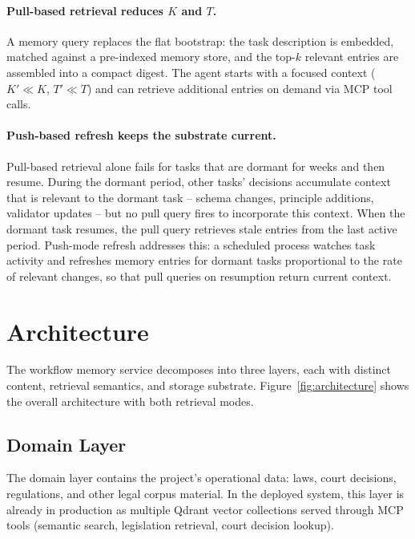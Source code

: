 \documentclass[11pt]{article}
\begin{document}
\paragraph{Pull-based retrieval reduces $K$ and $T$.}
A memory query replaces the flat bootstrap: the task description is embedded, matched against a pre-indexed memory store, and the top-$k$ relevant entries are assembled into a compact digest.
The agent starts with a focused context ($K' \ll K$, $T' \ll T$) and can retrieve additional entries on demand via MCP tool calls.

\paragraph{Push-based refresh keeps the substrate current.}
Pull-based retrieval alone fails for tasks that are dormant for weeks and then resume.
During the dormant period, other tasks' decisions accumulate context that is relevant to the dormant task -- schema changes, principle additions, validator updates -- but no pull query fires to incorporate this context.
When the dormant task resumes, the pull query retrieves stale entries from the last active period.
Push-mode refresh addresses this: a scheduled process watches task activity and refreshes memory entries for dormant tasks proportional to the rate of relevant changes, so that pull queries on resumption return current context.


\section{Architecture}
\label{sec:architecture}

The workflow memory service decomposes into three layers, each with distinct content, retrieval semantics, and storage substrate.
Figure~\ref{fig:architecture} shows the overall architecture with both retrieval modes.



\subsection{Domain Layer}
\label{sec:domain-layer}

The domain layer contains the project's operational data: laws, court decisions, regulations, and other legal corpus material.
In the deployed system, this layer is already in production as multiple Qdrant vector collections served through MCP tools (semantic search, legislation retrieval, court decision lookup).
\end{document}
